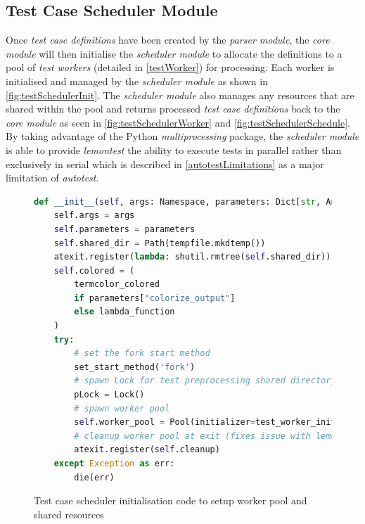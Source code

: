 \documentclass[hidelinks]{report}
\begin{document}
\subsection{Test Case Scheduler Module}
Once \textit{test case definitions} have been created by the \textit{parser module}, the \textit{core module} will then initialise the \textit{scheduler module} to allocate the definitions to a pool of \textit{test workers} (detailed in \autoref{testWorker}) for processing. Each worker is initialised and managed by the \textit{scheduler module} as shown in \autoref{fig:testSchedulerInit}. The \textit{scheduler module} also manages any resources that are shared within the pool and returns processed \textit{test case definitions} back to the \textit{core module} as seen in \autoref{fig:testSchedulerWorker} and \autoref{fig:testSchedulerSchedule}. By taking advantage of the Python \textit{multiprocessing} package, the \textit{scheduler module} is able to provide \textit{lemontest} the ability to execute tests in parallel rather than exclusively in serial which is described in \autoref{autotestLimitations} as a major limitation of \textit{autotest}.
\begin{figure}[h]
	\centering
	\begin{lstlisting}[language=python, breaklines=true, linewidth=\linewidth, tabsize=4]
def __init__(self, args: Namespace, parameters: Dict[str, Any]):
    self.args = args
    self.parameters = parameters
    self.shared_dir = Path(tempfile.mkdtemp())
    atexit.register(lambda: shutil.rmtree(self.shared_dir))
    self.colored = (
        termcolor_colored
        if parameters["colorize_output"]
        else lambda_function
    )
    try:
        # set the fork start method
        set_start_method('fork')
        # spawn Lock for test preprocessing shared directory access
        pLock = Lock()
        # spawn worker pool
        self.worker_pool = Pool(initializer=test_worker_init, initargs=(pLock,), processes=self.parameters["worker_count"], maxtasksperchild=1)
        # cleanup worker pool at exit (fixes issue with lemontest exiting without fully terminating processes)
        atexit.register(self.cleanup)
    except Exception as err:
        die(err)
	\end{lstlisting}
	\caption{Test case scheduler initialisation code to setup worker pool and shared resources}
	\label{fig:testSchedulerInit}
\end{figure}
\end{document}
